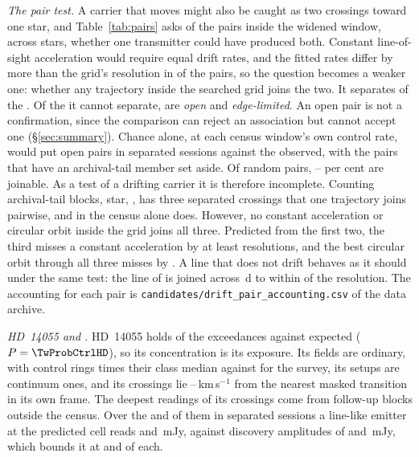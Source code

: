 \emph{The pair test.} A carrier that moves might also be caught as two
crossings toward one star, and Table~\ref{tab:pairs} asks of the \TjNPair{}
pairs inside the widened window, across \TjNStarPair{} stars, whether one
transmitter could have produced both. Constant line-of-sight acceleration
would require equal drift rates, and the fitted rates differ by more than the
grid's resolution in \TjNUneqDrift{} of the \TjNPair{} pairs, so the question
becomes a weaker one: whether any trajectory inside the searched grid joins
the two. It separates \TjNExcl{} of the \TjNPair. Of the \TjNOpen{} it
cannot separate, \TjNOpenPlain{} are \emph{open} and \TjNPairEdge{}
\emph{edge-limited}. An open pair is not a confirmation, since the
comparison can reject an association but cannot accept one
(\S\ref{sec:summary}). Chance alone, at each census window's own control
rate, would put \OpExpSepRange{} open pairs in separated sessions against the
\OpObsSep{} observed, with the pairs that have an archival-tail member set
aside. Of random pairs, \OpJoinPctLo--\OpJoinPctHi{} per cent are
joinable. As a test of a drifting carrier it is therefore incomplete.
Counting archival-tail blocks, \OpNTriAllWord{} star, \OpTriStars, has three
separated crossings that one trajectory joins pairwise, and in the census
alone \OpNTriCenWord{} does. However, no constant acceleration or circular
orbit inside the grid joins all three. Predicted from the first two, the
third misses a constant acceleration by at least
\TrAMissMin{} resolutions, and the best circular orbit through all three
misses by \TrJointMissMin. A line that does not drift behaves as it should
under the same test: the \TjCtlLine{} line of \TjCtlStar{} is joined across
\TjCtlDtD\,d to within \TjCtlNSig{} of the resolution. The accounting for
each pair is
\texttt{candidates/\allowbreak drift\_pair\_accounting.csv} of the data
archive.

\label{sec:twostars}%
\emph{HD~14055 and \BkAlmaName.} HD~14055 holds \TwNExcHD{} of the
exceedances against \TwExpCtrlHD{} expected ($P=\TwProbCtrlHD$), so its
concentration is its exposure. Its fields are ordinary, with control rings
\TwRingQHD{} times their class median against \TwRingQSurv{} for the survey,
its setups are continuum ones, and its crossings lie
\TwHDMaskLo--\TwHDMaskHi\,km\,s$^{-1}$ from the nearest masked transition in
its own frame. The deepest readings of its crossings come from follow-up
blocks outside the census. Over the \TwHDNDeepSepFirst{} and
\TwHDNDeepSepSecond{} of them in separated sessions a line-like emitter at
the predicted cell reads \TwHDRepFirst{} and \TwHDRepSecond\,mJy, against
discovery amplitudes of \TwHDDiscFirst{} and \TwHDDiscSecond\,mJy, which
bounds it at \TwHDFracFirst{} and \TwHDFracSecond{} of each.


